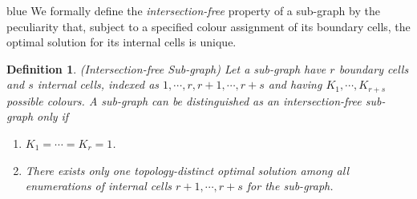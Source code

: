 \documentclass[journal]{IEEEtran}
\newtheorem{definition}[theorem]{Definition}
\begin{document}
\begin{color}{blue}
We formally define the \textit{intersection-free} property of a sub-graph by the peculiarity that, subject to a specified colour assignment of its boundary cells, the optimal solution for its internal cells is unique.

\begin{definition}
(Intersection-free Sub-graph) Let a sub-graph have $r$ boundary cells and $s$ internal cells, indexed as $1, \cdots, r, r+1, \cdots, r+s$ and having $K_1, \cdots, K_{r+s}$ possible colours. 
A sub-graph can be distinguished as an intersection-free sub-graph only if 
\begin{enumerate}
\item $K_1 = \cdots = K_r = 1$.
\item There exists only one topology-distinct optimal solution among all enumerations of internal cells $r+1, \cdots, r+s$ for the sub-graph. 
\end{enumerate}
\end{definition}
\end{color}
\end{document}
